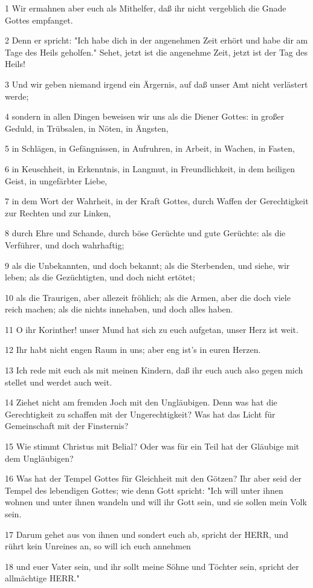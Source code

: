 \par 1 Wir ermahnen aber euch als Mithelfer, daß ihr nicht vergeblich die Gnade Gottes empfanget.
\par 2 Denn er spricht: "Ich habe dich in der angenehmen Zeit erhört und habe dir am Tage des Heils geholfen." Sehet, jetzt ist die angenehme Zeit, jetzt ist der Tag des Heils!
\par 3 Und wir geben niemand irgend ein Ärgernis, auf daß unser Amt nicht verlästert werde;
\par 4 sondern in allen Dingen beweisen wir uns als die Diener Gottes: in großer Geduld, in Trübsalen, in Nöten, in Ängsten,
\par 5 in Schlägen, in Gefängnissen, in Aufruhren, in Arbeit, in Wachen, in Fasten,
\par 6 in Keuschheit, in Erkenntnis, in Langmut, in Freundlichkeit, in dem heiligen Geist, in ungefärbter Liebe,
\par 7 in dem Wort der Wahrheit, in der Kraft Gottes, durch Waffen der Gerechtigkeit zur Rechten und zur Linken,
\par 8 durch Ehre und Schande, durch böse Gerüchte und gute Gerüchte: als die Verführer, und doch wahrhaftig;
\par 9 als die Unbekannten, und doch bekannt; als die Sterbenden, und siehe, wir leben; als die Gezüchtigten, und doch nicht ertötet;
\par 10 als die Traurigen, aber allezeit fröhlich; als die Armen, aber die doch viele reich machen; als die nichts innehaben, und doch alles haben.
\par 11 O ihr Korinther! unser Mund hat sich zu euch aufgetan, unser Herz ist weit.
\par 12 Ihr habt nicht engen Raum in uns; aber eng ist's in euren Herzen.
\par 13 Ich rede mit euch als mit meinen Kindern, daß ihr euch auch also gegen mich stellet und werdet auch weit.
\par 14 Ziehet nicht am fremden Joch mit den Ungläubigen. Denn was hat die Gerechtigkeit zu schaffen mit der Ungerechtigkeit? Was hat das Licht für Gemeinschaft mit der Finsternis?
\par 15 Wie stimmt Christus mit Belial? Oder was für ein Teil hat der Gläubige mit dem Ungläubigen?
\par 16 Was hat der Tempel Gottes für Gleichheit mit den Götzen? Ihr aber seid der Tempel des lebendigen Gottes; wie denn Gott spricht: "Ich will unter ihnen wohnen und unter ihnen wandeln und will ihr Gott sein, und sie sollen mein Volk sein.
\par 17 Darum gehet aus von ihnen und sondert euch ab, spricht der HERR, und rührt kein Unreines an, so will ich euch annehmen
\par 18 und euer Vater sein, und ihr sollt meine Söhne und Töchter sein, spricht der allmächtige HERR."

